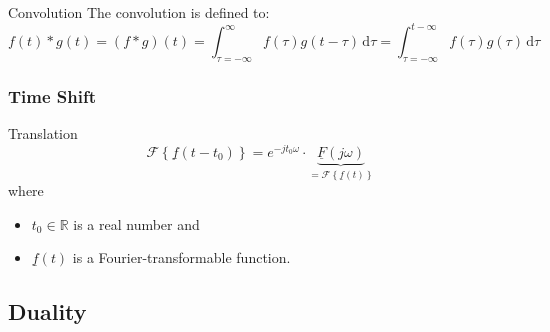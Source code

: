 \begin{refsection}
\begin{excursus}{Convolution}
	The convolution is defined to:
	\begin{equation}
		f(t) * g(t) = \left(f * g\right) (t) = \int_{\tau = -\infty}^{\infty} f(\tau) g(t - \tau) \, \mathrm{d} \tau  = \int_{\tau = -\infty}^{t - \infty} f(\tau) g(\tau) \, \mathrm{d} \tau
		\label{eq:ch02:def_convolution}
	\end{equation}
\end{excursus}

\subsubsection{Time Shift}


\begin{definition}{Translation}
	\begin{equation}
		\mathcal{F}\left\{\underline{f}(t - t_0)\right\} = e^{-j t_0 \omega} \cdot \underbrace{\underline{F} \left(j \omega\right)}_{= \mathcal{F}\left\{\underline{f}(t)\right\}}
		\label{eq:ch02:op_time_shift}
	\end{equation}
	where
	\begin{itemize}
		\item $t_0 \in \mathbb{R}$ is a real number and
		\item $\underline{f}(t)$ is a Fourier-transformable function.
	\end{itemize}
\end{definition}

\subsection{Duality}


\end{refsection}
